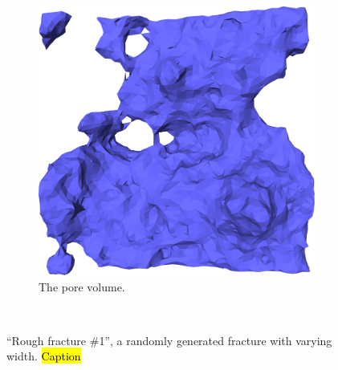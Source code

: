 \begin{figure}[!p]
\begin{subfigure}[t]{\myfigwidth}
        \includegraphics[width=\textwidth]{images/systems/trimmed-rough_fracture01_abel_22}%
        \caption{The pore volume.}%
    \end{subfigure}%
    \vspace{10pt}\\%
    \caption{%
        ``Rough fracture \#1'', a randomly generated fracture with varying width. \hl{Caption} %
        \label{fig:renderings_rough_fracture01_abel}%
    }%
\end{figure}%

